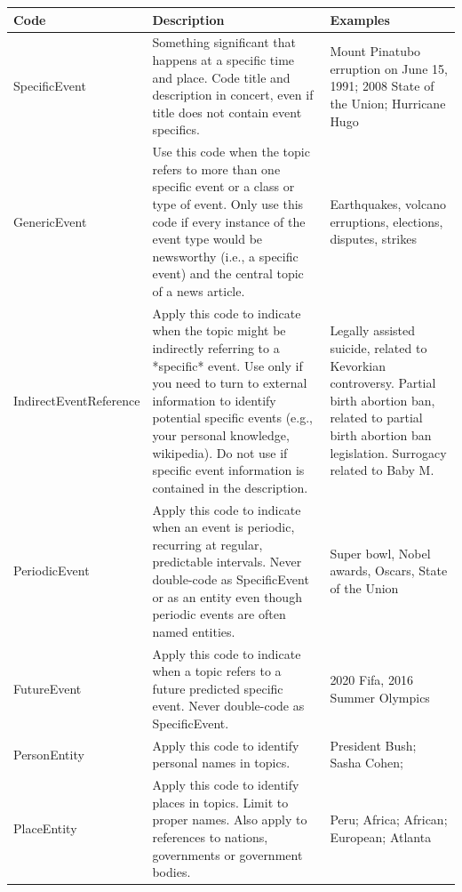 \documentclass{sig-alternate}
\begin{document}
%



  

\appendix


\begin{table}[H]
\small
\begin{tabular}{| l | p{7cm}  | p{7cm}  |} \hline
\bf{Code} & \bf{Description} & \bf{Examples}  \\ \hline
SpecificEvent & Something significant that happens at a specific time and place. Code title and description in concert, even if title does not contain event specifics. & Mount Pinatubo erruption on June 15, 1991; 2008 State of the Union; Hurricane Hugo \\ \hline
GenericEvent & Use this code when the topic refers to more than one specific event or a class or type of event. Only use this code if every instance of the event type would be newsworthy (i.e., a specific event) and the central topic of a news article. & Earthquakes, volcano erruptions, elections, disputes, strikes \\ \hline
IndirectEventReference & Apply this code to indicate when the topic might be indirectly referring to a *specific* event. Use only if you need to turn to external information to identify potential specific events (e.g., your personal knowledge, wikipedia). Do not use if specific event information is contained in the description. & Legally assisted suicide, related to Kevorkian controversy. Partial birth abortion ban, related to partial birth abortion ban legislation. Surrogacy related to Baby M. \\ \hline
PeriodicEvent & Apply this code to indicate when an event is periodic, recurring at regular, predictable intervals. Never double-code as SpecificEvent or as an entity even though periodic events are often named entities. & Super bowl, Nobel awards, Oscars, State of the Union \\ \hline
FutureEvent & Apply this code to indicate when a topic refers to a future predicted specific event. Never double-code as SpecificEvent. & 2020 Fifa, 2016 Summer Olympics \\ \hline
PersonEntity & Apply this code to identify personal names in topics. & President Bush; Sasha Cohen;  \\ \hline
PlaceEntity & Apply this code to identify places in topics. Limit to proper names. Also apply to references to nations, governments or government bodies. & Peru; Africa; African; European; Atlanta \\ \hline

\end{tabular}
\end{table}
\end{document}
